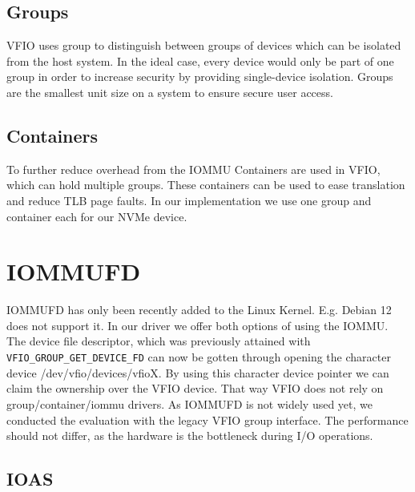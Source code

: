 \subsection{Groups}
VFIO uses group to distinguish between groups of devices which can be isolated from the host system. In the ideal case, every device would only be part of one group in order to increase security by providing single-device isolation. Groups are the smallest unit size on a system to ensure secure user access.

\subsection{Containers}
To further reduce overhead from the IOMMU Containers are used in VFIO, which can hold multiple groups. These containers can be used to ease translation and reduce TLB page faults.
In our implementation we use one group and container each for our NVMe device.

\section{IOMMUFD}
IOMMUFD has only been recently added to the Linux Kernel. E.g. Debian 12 does not support it. In our driver we offer both options of using the IOMMU.
The device file descriptor, which was previously attained with \texttt{VFIO\_GROUP\_GET\_DEVICE\_FD} can now be gotten through opening the character device /dev/vfio/devices/vfioX.
By using this character device pointer we can claim the ownership over the VFIO device. That way VFIO does not rely on group/container/iommu drivers.
As IOMMUFD is not widely used yet, we conducted the evaluation with the legacy VFIO group interface. The performance should not differ, as the hardware is the bottleneck during I/O operations.

\subsection{IOAS}
